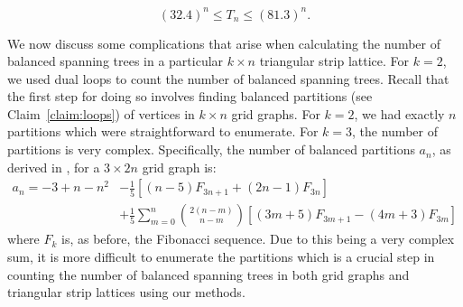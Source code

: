 \documentclass{amsart}
\theoremstyle{definition}
\begin{document}
\[(32.4)^n \leq T_n \leq (81.3)^n.\]

\par 

We now discuss some complications that arise when calculating the number of balanced spanning trees in a particular $k \times n$ triangular strip lattice. For $k = 2$, we used dual loops to count the number of balanced spanning trees. Recall that the first step for doing so involves finding balanced partitions (see Claim~\ref{claim:loops}) of vertices in $k \times n$ grid graphs. For $k = 2$, we had exactly $n$ partitions which were straightforward to enumerate. For $k = 3$, the number of partitions is very complex. Specifically, the number of 
balanced partitions $a_n$, as derived in \cite{dc7c0db6-9a45-301d-9d83-89b4d73201a1}, for a $3 \times 2n$ grid graph is: 
\begin{align*}
a_{n} = -3 + n - n^2 &- \frac{1}{5}[(n - 5)F_{3n + 1} + (2n - 1)F_{3n}]\\
\quad &+ \frac{1}{5}\sum_{m = 0}^n \binom{2(n - m)}{n - m}[(3m + 5)F_{3m + 1} - (4m + 3)F_{3m}]
\end{align*} where $F_k$ is, as before, the Fibonacci sequence.
Due to this being a very complex sum, it is  more difficult to enumerate the partitions which is a crucial step in counting the number of balanced spanning trees in both grid graphs and triangular strip lattices using our methods. 


\end{document}

